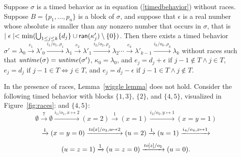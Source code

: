 \begin{lemma}
\label{wiggle lemma}
Suppose $\sigma$ is a timed behavior as in equation (\ref{timedbehavior}) without races.
Suppose $B = \{ p_1 ,\ldots, p_u \}$ is a block of $\sigma$, and suppose
that $\epsilon$ is a real number whose absolute is smaller than any nonzero number that occurs in $\sigma$, that is
$\mid \epsilon \mid  < \min (\bigcup_{1 \leq j \leq k} \{ d_j \} \cup {\textsf{ran}}(\kappa'_j) \setminus \{ 0 \} )$.
Then there exists a timed behavior
$\sigma'  =  \lambda_0 \xrightarrow{e_1} \lambda'_0 \xrightarrow{i_1/o_1, \rho_1} \lambda_1 \xrightarrow{e_2} \lambda'_1 \xrightarrow{i_2/o_2, \rho_2} \lambda_2 \cdots
\xrightarrow{e_k} \lambda'_{k-1} \xrightarrow{i_k/o_k, \rho_k} \lambda_{k}$
without races such that
$\mathit{untime}(\sigma)=\mathit{untime}(\sigma')$,
$\kappa_0 = \lambda_0$, and
$e_j  =  d_j + \epsilon  \mbox{ if } j-1 \not\in T \wedge j \in T$,
$e_j = d_j  \mbox{ if } j-1 \in T \Leftrightarrow j \in T$, and
$e_j = d_j - \epsilon  \mbox{ if } j-1 \in T \wedge j \not\in T$.
\end{lemma}
In the presence of races, Lemma~\ref{wiggle lemma} does not hold. 
Consider the following timed behavior with blocks $\{ 1, 3 \}$, $\{ 2 \}$,
\iflong 
and $\{ 4, 5 \}$, visualized in Figure~\ref{fig:races}:
\else
and $\{ 4, 5 \}$:
\fi
\[
\emptyset \xrightarrow{7} \emptyset \xrightarrow{i_1/o_1, x \mapsto 2} (x=2) \xrightarrow{1} (x=1)
\xrightarrow{i_2/o_2, y \mapsto 1} (x=y=1)  
\]
\[
\xrightarrow{1} (x=y=0)
\xrightarrow{\mathit{to}[x]/o_3, u \mapsto 2} (u=2)
\xrightarrow{1} (u=1)
\xrightarrow{i_4/o_4, z \mapsto 1} 
\]
\[
(u=z=1)
\xrightarrow{1} (u=z=0)\xrightarrow{\mathit{to}[z]/o_5} (u=0).
\]


